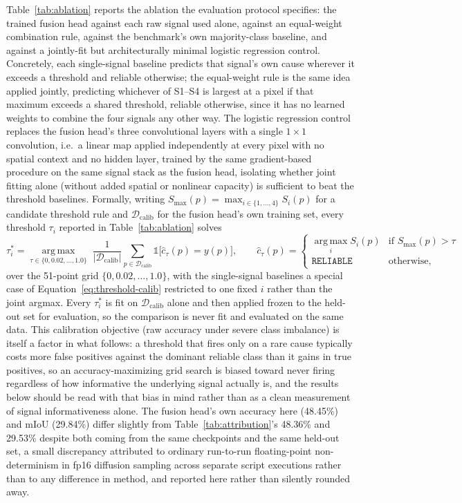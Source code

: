 \documentclass[review]{elsarticle}
\begin{document}
Table~\ref{tab:ablation} reports the ablation the evaluation protocol specifies: the trained fusion head against each raw signal used alone, against an equal-weight combination rule, against the benchmark's own majority-class baseline, and against a jointly-fit but architecturally minimal logistic regression control. Concretely, each single-signal baseline predicts that signal's own cause wherever it exceeds a threshold and reliable otherwise; the equal-weight rule is the same idea applied jointly, predicting whichever of S1--S4 is largest at a pixel if that maximum exceeds a shared threshold, reliable otherwise, since it has no learned weights to combine the four signals any other way. The logistic regression control replaces the fusion head's three convolutional layers with a single $1\times1$ convolution, i.e.\ a linear map applied independently at every pixel with no spatial context and no hidden layer, trained by the same gradient-based procedure on the same signal stack as the fusion head, isolating whether joint fitting alone (without added spatial or nonlinear capacity) is sufficient to beat the threshold baselines. Formally, writing $S_{\max}(p) = \max_{i \in \{1,\dots,4\}} S_i(p)$ for a candidate threshold rule and $\mathcal{D}_{\mathrm{calib}}$ for the fusion head's own training set, every threshold $\tau_i$ reported in Table~\ref{tab:ablation} solves
\begin{equation}
\tau_i^\ast = \operatorname*{arg\,max}_{\tau \in \{0, 0.02, \dots, 1.0\}} \; \frac{1}{|\mathcal{D}_{\mathrm{calib}}|}\sum_{p \in \mathcal{D}_{\mathrm{calib}}} \mathbb{1}\Big[\hat{c}_\tau(p) = y(p)\Big], \qquad \hat{c}_\tau(p) = \begin{cases} \operatorname*{arg\,max}_i S_i(p) & \text{if } S_{\max}(p) > \tau \\ \texttt{RELIABLE} & \text{otherwise,} \end{cases}
\label{eq:threshold-calib}
\end{equation}
over the 51-point grid $\{0, 0.02, \dots, 1.0\}$, with the single-signal baselines a special case of Equation~\ref{eq:threshold-calib} restricted to one fixed $i$ rather than the joint argmax. Every $\tau_i^\ast$ is fit on $\mathcal{D}_{\mathrm{calib}}$ alone and then applied frozen to the held-out set for evaluation, so the comparison is never fit and evaluated on the same data. This calibration objective (raw accuracy under severe class imbalance) is itself a factor in what follows: a threshold that fires only on a rare cause typically costs more false positives against the dominant reliable class than it gains in true positives, so an accuracy-maximizing grid search is biased toward never firing regardless of how informative the underlying signal actually is, and the results below should be read with that bias in mind rather than as a clean measurement of signal informativeness alone. The fusion head's own accuracy here (48.45\%) and mIoU (29.84\%) differ slightly from Table~\ref{tab:attribution}'s 48.36\% and 29.53\% despite both coming from the same checkpoints and the same held-out set, a small discrepancy attributed to ordinary run-to-run floating-point non-determinism in fp16 diffusion sampling across separate script executions rather than to any difference in method, and reported here rather than silently rounded away.
\end{document}
